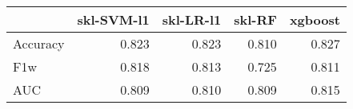 \begin{tabular}{lrrrr}
\toprule
{} &  skl-SVM-l1 &  skl-LR-l1 &  skl-RF &  xgboost \\
\midrule
Accuracy &       0.823 &      0.823 &   0.810 &    0.827 \\
F1w      &       0.818 &      0.813 &   0.725 &    0.811 \\
AUC      &       0.809 &      0.810 &   0.809 &    0.815 \\
\bottomrule
\end{tabular}
